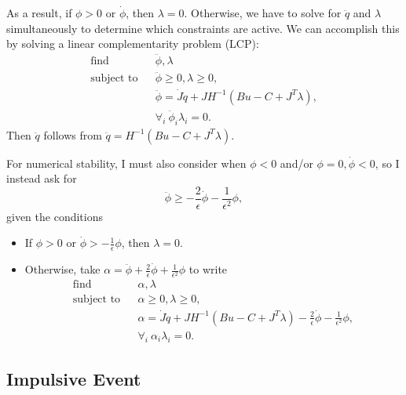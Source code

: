 \documentclass{article}
\DeclareMathOperator*{\find}{find}
\newcommand{\subjto}{\text{subject to}}
\begin{document}
As a result, if $\phi>0$ or $\dot{\phi}$, then $\lambda = 0$.  Otherwise, we have
to solve for $\ddot{q}$ and $\lambda$ simultaneously to determine
which constraints are active.  We can accomplish this by solving a linear complementarity problem (LCP):
\begin{eqnarray*}
  \find & & \ddot{\phi}, \lambda \\
 \subjto & & \ddot{\phi} \ge 0, \lambda \ge 0, \\
& & \ddot{\phi} = \dot{J} \dot{q} + J H^{-1} (Bu - C + J^T \lambda), \\
 & & \forall_i ~ \ddot\phi_i \lambda_i = 0.
\end{eqnarray*}
Then $\ddot{q}$ follows from $\ddot{q} = H^{-1}( Bu - C + J^T \lambda ).$

For numerical stability, I must also consider when $\phi < 0$ and/or
$\phi=0,\dot{\phi}<0$, so I instead ask for $$\ddot{\phi} \ge
-\frac{2}{\epsilon} \dot{\phi} - \frac{1}{\epsilon^2} \phi,$$ given
the conditions
\begin{itemize} 
\item If $\phi>0$ or $\dot{\phi} > -\frac{1}{\epsilon} \phi$, then
  $\lambda = 0$.
\item Otherwise, take $\alpha = \ddot\phi + \frac{2}{\epsilon}\dot\phi
  + \frac{1}{\epsilon^2} \phi$ to write
\begin{eqnarray*}
  \find & & \alpha, \lambda \\
 \subjto & & \alpha \ge 0, \lambda \ge 0, \\
& & \alpha = \dot{J} \dot{q} + J H^{-1} (Bu - C + J^T \lambda) -
\frac{2}{\epsilon} \dot\phi - \frac{1}{\epsilon^2} \phi, \\
 & & \forall_i ~ \alpha_i \lambda_i = 0.
\end{eqnarray*}
\end{itemize}

\subsection{Impulsive Event}
\end{document}

